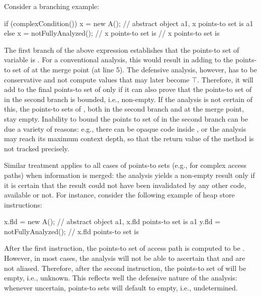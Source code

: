 Consider a branching example:

\begin{javaBoxLn}
if (complexCondition())
    x = new A();            // abstract object a1, x points-to set is {a1}
else
    x = notFullyAnalyzed(); // x points-to set is {} 
// x points-to set is {} 
\end{javaBoxLn}

The first branch of the above  expression establishes that the points-to set of variable  is . For a conventional analysis, this would result in adding  to the points-to set of  at the merge point (at line 5). The defensive analysis, however, has to be conservative and not compute values that may later become $\top$. Therefore, it will add  to the final points-to set of  only if it can also prove that the points-to set of  in the second branch is bounded, i.e., non-empty. If the analysis is not certain of this, the points-to sets of , both in the second branch and at the merge point, stay empty. Inability to bound the points to set of  in the second branch can be due a variety of reasons: e.g., there can be opaque code inside , or the analysis may reach its maximum context depth, so that the return value of the method is not tracked precisely.


Similar treatment applies to all cases of points-to sets (e.g., for complex access paths) when information is merged: the analysis yields a non-empty result only if it is certain that the result could not have been invalidated by any other code, available or not. For instance, consider the following example of heap store
instructions:

\begin{javaBox}
x.fld = new A();            // abstract object a1, x.fld points-to set is {a1}
y.fld = notFullyAnalyzed(); // x.fld points-to set is {}
\end{javaBox}

After the first instruction, the points-to set of access path  is computed to be . However, in most cases, the analysis will not be able to ascertain that  and  are not aliased. Therefore, after the second instruction, the points-to set of  will be empty, i.e., unknown. This reflects well the defensive nature of the analysis: whenever uncertain, points-to sets will default to empty, i.e., undetermined.

